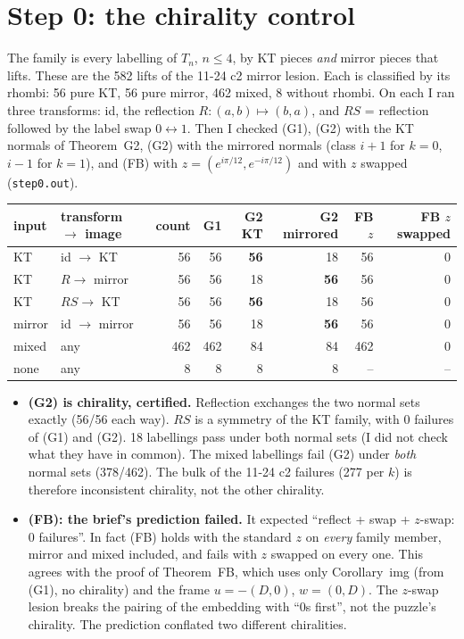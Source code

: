 \documentclass[11pt]{article}
\theoremstyle{definition}\newtheorem{definition}[theorem]{Definition}\newtheorem{remark}[theorem]{Remark}
\begin{document}
\section{Step 0: the chirality control}\label{sec:step0}
The family is every labelling of $T_n$, $n\le4$, by KT pieces \emph{and} mirror pieces that lifts. These are the 582 lifts of the 11-24 c2 mirror lesion. Each is classified by its rhombi: 56 pure KT, 56 pure mirror, 462 mixed, 8 without rhombi. On each I ran three transforms: id, the reflection $R:(a,b)\mapsto(b,a)$, and $RS$ = reflection followed by the label swap $0\leftrightarrow1$. Then I checked (G1), (G2) with the KT normals of Theorem~G2, (G2) with the mirrored normals (class $i+1$ for $k=0$, $i-1$ for $k=1$), and (FB) with $z=(e^{i\pi/12},e^{-i\pi/12})$ and with $z$ swapped (\texttt{step0.out}).
\begin{center}\small\begin{tabular}{llrrrrrr}\toprule
input & transform $\to$ image & count & G1 & G2 KT & G2 mirrored & FB $z$ & FB $z$ swapped\\\midrule
KT & id $\to$ KT & 56 & 56 & \textbf{56} & 18 & 56 & 0\\
KT & $R\to$ mirror & 56 & 56 & 18 & \textbf{56} & 56 & 0\\
KT & $RS\to$ KT & 56 & 56 & \textbf{56} & 18 & 56 & 0\\
mirror & id $\to$ mirror & 56 & 56 & 18 & \textbf{56} & 56 & 0\\
mixed & any & 462 & 462 & 84 & 84 & 462 & 0\\
none & any & 8 & 8 & 8 & 8 & -- & --\\\bottomrule
\end{tabular}\end{center}
\begin{itemize}
\item \textbf{(G2) is chirality, certified.} Reflection exchanges the two normal sets exactly (56/56 each way). $RS$ is a symmetry of the KT family, with 0 failures of (G1) and (G2). 18 labellings pass under both normal sets (I did not check what they have in common). The mixed labellings fail (G2) under \emph{both} normal sets (378/462). The bulk of the 11-24 c2 failures (277 per $k$) is therefore inconsistent chirality, not the other chirality.
\item \textbf{(FB): the brief's prediction failed.} It expected ``reflect + swap + $z$-swap: 0 failures''. In fact (FB) holds with the standard $z$ on \emph{every} family member, mirror and mixed included, and fails with $z$ swapped on every one. This agrees with the proof of Theorem~FB, which uses only Corollary~img (from (G1), no chirality) and the frame $u=-(D,0)$, $w=(0,D)$. The $z$-swap lesion breaks the pairing of the embedding with ``$0$s first'', not the puzzle's chirality. The prediction conflated two different chiralities.
\end{itemize}
\end{document}
